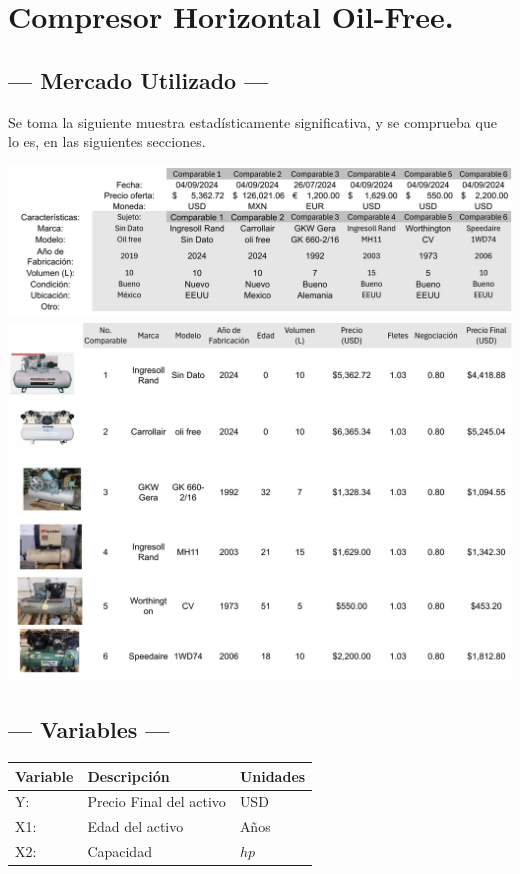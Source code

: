 
\section{Compresor Horizontal Oil-Free.} %

\subsection{\centering --- Mercado Utilizado ---} %
Se toma la siguiente muestra estadísticamente significativa, y se 
comprueba que lo es, en las siguientes secciones.
\begin{center}
\includegraphics[width=  0.7 \linewidth, page = 1]{../0.imagenes/CAP_8/mercado_4_1}
\includegraphics[width=  0.8\linewidth, page = 1]{../0.imagenes/CAP_8/mercado_4_2}
\end{center}

\subsection{\centering --- Variables ---} %
\begin{center}
  \begin{tabular}{|l|l|l|}
    \hline 
    Variable & Descripción   & Unidades\\ \hline 
    Y:  & Precio Final del activo  & USD \\ \hline 
    X1: & Edad del activo    & Años \\ \hline 
		X2: & Capacidad  & \(hp\) \\ \hline 
  \end{tabular}
\end{center} 

